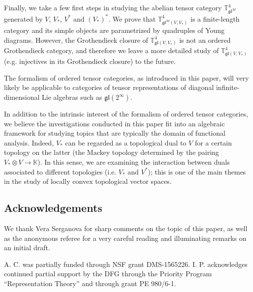 \documentclass[11pt]{article}
\theoremstyle{plain}
\theoremstyle{nonumberplain}
\theoremstyle{plain}
\theoremstyle{nonumberplain}
\newcommand\bK{{\mathbb K}}
\newcommand\bT{{\mathbb T}}
\newcommand\fgl{\mathfrak{gl}}
\begin{document}
Finally, we take a few first steps in studying the abelian tensor category $\bT^4_{\fgl^M}$ generated by $V$, $V_*$, $V^*$ and $(V_*)^*$. We prove that $\bT^4_{\fgl^M\left(V,V_*\right)}$ is a finite-length category and its simple objects are parametrized by quadruples of Young diagrams. However, the Grothendieck closure of $\bT^4_{\fgl\left(V,V_*\right)}$ is not an ordered Grothendieck category, and therefore we leave a more detailed study of $\bT^4_{\fgl\left(V,V_*\right)}$
(e.g. injectives in its Grothendieck closure) to the future. 

The formalism of ordered tensor categories, as introduced in this paper, will very likely be applicable to categories of tensor representations of diagonal infinite-dimensional Lie algebras such as $\fgl(2^\infty)$. 

In addition to the intrinsic interest of the formalism of ordered tensor categories, we believe the investigations conducted in this paper fit into an algebraic framework for studying topics that are typically the domain of functional analysis. Indeed, $V_*$ can be regarded as a topological dual to $V$ for a certain topology on the latter (the Mackey topology determined by the pairing $V_*\otimes V \to \bK$).  In this sense, we are examining the interaction between duals associated to different topologies (i.e. $V_*$ and $V^*$); this is one of the main themes in the study of locally convex topological vector spaces.



\subsection*{Acknowledgements}


We thank Vera Serganova for sharp comments on the topic of this paper, as well as the anonymous referee for a very careful reading and illuminating remarks on an initial draft. 

A. C. was partially funded through NSF grant DMS-1565226. I. P. acknowledges continued partial support by the DFG through the  Priority Program ``Representation Theory'' and through grant PE 980/6-1.  



\end{document}
